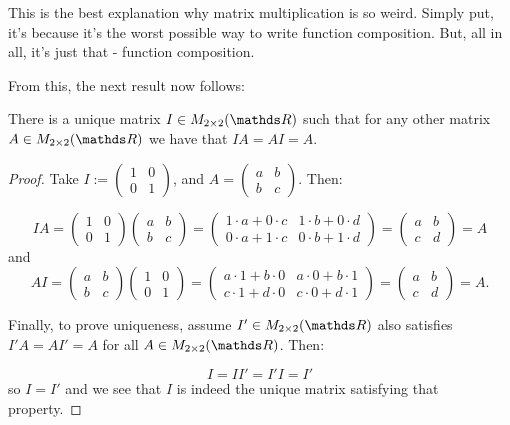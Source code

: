 This is the best explanation why matrix multiplication is so weird. Simply put, it's because it's the worst possible way to write function composition. But, all in all, it's just that - function composition.

From this, the next result now follows:

\begin{lemma}
	There is a unique matrix $I\in M_{2\times 2}(\R)$ such that for any other matrix $A\in M_{2\times 2}(\R)$ we have that $IA=AI=A$.
\end{lemma}
\begin{proof}
	Take $I:=\begin{pmatrix}
	1&0\\0&1
	\end{pmatrix}$, and $A=\begin{pmatrix}
	a&b\\
	b&c
	\end{pmatrix}$. Then:
	
	\[IA=\begin{pmatrix}
	1&0\\0&1
	\end{pmatrix}\begin{pmatrix}
	a&b\\
	b&c
	\end{pmatrix}=\begin{pmatrix}
	1\cdot a+0\cdot c&1\cdot b+0\cdot d\\0\cdot a+1\cdot c&0\cdot b+1\cdot d
	\end{pmatrix}=\begin{pmatrix}
	a&b\\c&d
	\end{pmatrix}=A\]and
	\[AI=\begin{pmatrix}
	a&b\\
	b&c
	\end{pmatrix}\begin{pmatrix}
	1&0\\0&1
	\end{pmatrix}=\begin{pmatrix}
	a\cdot 1+b\cdot 0&a\cdot 0+b\cdot 1\\c\cdot 1+d\cdot 0&c\cdot 0+d\cdot 1
	\end{pmatrix}=\begin{pmatrix}
	a&b\\c&d
	\end{pmatrix}=A.\]
	
	Finally, to prove uniqueness, assume $I'\in M_{2\times 2}(\R)$ also satisfies $I'A=AI'=A$ for all $A\in M_{2\times 2}(\R)$. Then:
	
	\[I=II'=I'I=I'\]so $I=I'$ and we see that $I$ is indeed the unique matrix satisfying that property.
\end{proof}

